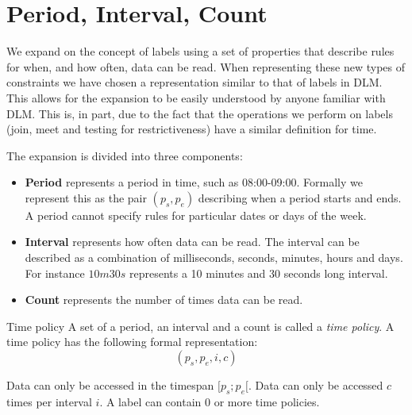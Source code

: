 
\section{\textbf{P}eriod, \textbf{I}nterval, \textbf{C}ount}
We expand on the concept of labels using a set of properties that describe rules for when, and how often, data can be read.
When representing these new types of constraints we have chosen a representation similar to that of labels in DLM.
This allows for the expansion to be easily understood by anyone familiar with DLM.
This is, in part, due to the fact that the operations we perform on labels (join, meet and testing for restrictiveness) have a similar definition for time.

The expansion is divided into three components:
\begin{itemize}
  \item \textbf{Period} represents a period in time, such as 08:00-09:00.
  Formally we represent this as the pair $(p_s, p_e)$ describing when a period starts and ends.
  A period cannot specify rules for particular dates or days of the week.

  \item \textbf{Interval} represents how often data can be read.
  The interval can be described as a combination of milliseconds, seconds, minutes, hours and days.
  For instance $10m30s$ represents a 10 minutes and 30 seconds long interval.

  \item \textbf{Count} represents the number of times data can be read.
\end{itemize}

\begin{definition}{Time policy}
  A set of a period, an interval and a count is called a \textit{time policy}.
  A time policy has the following formal representation: $$(p_s, p_e, i, c)$$

  Data can only be accessed in the timespan $[p_s; p_e[$.
  Data can only be accessed $c$ times per interval $i$.
  A label can contain 0 or more time policies.
\end{definition}

